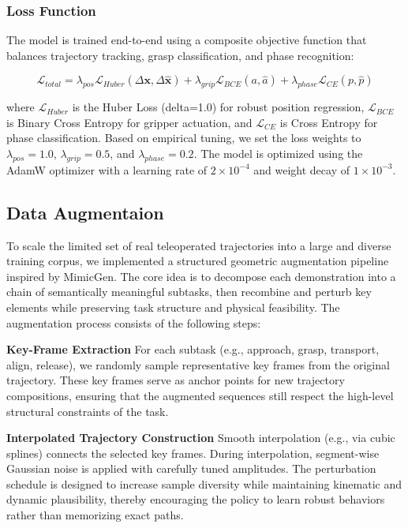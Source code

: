 \documentclass{article} %
\begin{document}
\subsubsection{Loss Function}
The model is trained end-to-end using a composite objective function that balances trajectory tracking, grasp classification, and phase recognition:

\begin{equation}
\mathcal{L}_{total} = \lambda_{pos} \mathcal{L}_{Huber}(\Delta \mathbf{x}, \Delta \hat{\mathbf{x}}) + \lambda_{grip} \mathcal{L}_{BCE}(a, \hat{a}) + \lambda_{phase} \mathcal{L}_{CE}(p, \hat{p})
\end{equation}

where $\mathcal{L}_{Huber}$ is the Huber Loss (delta=1.0) for robust position regression, $\mathcal{L}_{BCE}$ is Binary Cross Entropy for gripper actuation, and $\mathcal{L}_{CE}$ is Cross Entropy for phase classification. Based on empirical tuning, we set the loss weights to $\lambda_{pos}=1.0$, $\lambda_{grip}=0.5$, and $\lambda_{phase}=0.2$. The model is optimized using the AdamW optimizer with a learning rate of $2 \times 10^{-4}$ and weight decay of $1 \times 10^{-3}$.

\subsection{Data Augmentaion}
To scale the limited set of real teleoperated trajectories into a large and diverse training corpus, we implemented a structured geometric augmentation pipeline inspired by MimicGen. The core idea is to decompose each demonstration into a chain of semantically meaningful subtasks, then recombine and perturb key elements while preserving task structure and physical feasibility. The augmentation process consists of the following steps:

{\bf Key-Frame Extraction}
For each subtask (e.g., approach, grasp, transport, align, release), we randomly sample representative key frames from the original trajectory. These key frames serve as anchor points for new trajectory compositions, ensuring that the augmented sequences still respect the high-level structural constraints of the task.

{\bf Interpolated Trajectory Construction}
Smooth interpolation (e.g., via cubic splines) connects the selected key frames. During interpolation, segment-wise Gaussian noise is applied with carefully tuned amplitudes. The perturbation schedule is designed to increase sample diversity while maintaining kinematic and dynamic plausibility, thereby encouraging the policy to learn robust behaviors rather than memorizing exact paths.
\end{document}
